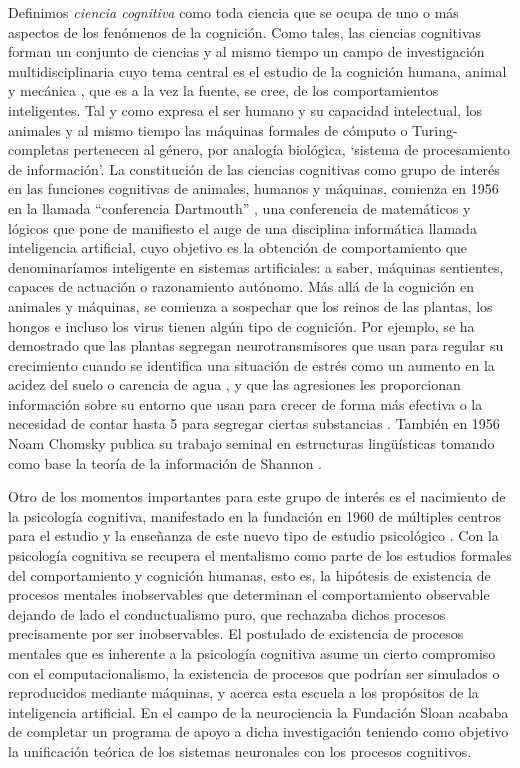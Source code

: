 \documentclass[12pt]{memoir}
\begin{document}
\begin{appendices}
Definimos \textit{ciencia cognitiva} como toda ciencia que se ocupa de uno o más aspectos de los fenómenos de la cognición. Como tales, las ciencias cognitivas forman un conjunto de ciencias y al mismo tiempo un campo de investigación multidisciplinaria cuyo tema central es el estudio de la cognición humana, animal y mecánica \parencite[p.20]{pmf07}, que es a la vez la fuente, se cree, de los comportamientos inteligentes. Tal y como expresa \parencite{humanProblemSolving} el ser humano y su capacidad intelectual, los animales y al mismo tiempo las máquinas formales de cómputo o Turing-completas pertenecen al género, por analogía biológica, `sistema de procesamiento de información'. La constitución de las ciencias cognitivas como grupo de interés en las funciones cognitivas de animales, humanos y máquinas, comienza en 1956 en la llamada ``conferencia Dartmouth'' \parencite[p.142]{theCognitiveRevolution}, una conferencia de matemáticos y lógicos que pone de manifiesto el auge de una disciplina informática llamada inteligencia artificial, cuyo objetivo es la obtención de comportamiento que denominaríamos inteligente en sistemas artificiales: a saber, máquinas sentientes, capaces de actuación o razonamiento autónomo. Más allá de la cognición en animales y máquinas, se comienza a sospechar que los reinos de las plantas, los hongos e incluso los virus tienen algún tipo de cognición. Por ejemplo, se ha demostrado que las plantas segregan neurotransmisores que usan para regular su crecimiento cuando se identifica una situación de estrés como un aumento en la acidez del suelo o carencia de agua \parencite{plants}, y que las agresiones les proporcionan información sobre su entorno que usan para crecer de forma más efectiva o la necesidad de contar hasta 5 para segregar ciertas substancias \parencite{plantCognition}. También en 1956 Noam Chomsky publica su trabajo seminal en estructuras lingüísticas tomando como base la teoría de la información de Shannon \parencite[p.142-143]{theCognitiveRevolution}.

Otro de los momentos importantes para este grupo de interés es el nacimiento de la psicología cognitiva, manifestado en la fundación en 1960 de múltiples centros para el estudio y la enseñanza de este nuevo tipo de estudio psicológico \parencite[p.143]{theCognitiveRevolution}. Con la psicología cognitiva se recupera el mentalismo como parte de los estudios formales del comportamiento y cognición humanas, esto es, la hipótesis de existencia de procesos mentales inobservables que determinan el comportamiento observable dejando de lado el conductualismo puro, que rechazaba dichos procesos precisamente por ser inobservables. El postulado de existencia de procesos mentales que es inherente a la psicología cognitiva asume un cierto compromiso con el computacionalismo, la existencia de procesos que podrían ser simulados o reproducidos mediante máquinas, y acerca esta escuela a los propósitos de la inteligencia artificial. En el campo de la neurociencia la Fundación Sloan acababa de completar un programa de apoyo a dicha investigación teniendo como objetivo la unificación teórica de los sistemas neuronales con los procesos cognitivos.


\end{appendices}
\end{document}
